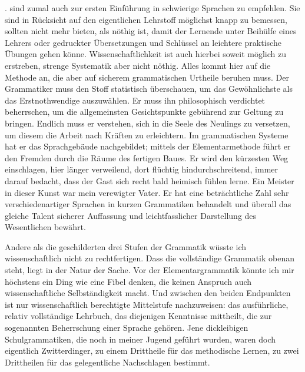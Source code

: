 .  sind zumal auch zur ersten Einführung in schwierige Sprachen zu empfehlen. Sie sind in Rücksicht auf den eigentlichen Lehrstoff möglichst knapp zu bemessen, sollten nicht mehr bieten, als nöthig ist, damit der Lernende unter Beihülfe \label{fp.118} eines Lehrers oder gedruckter Übersetzungen und Schlüssel an leichtere praktische Übungen gehen könne. Wissenschaftlichkeit ist auch hierbei soweit möglich zu erstreben, strenge Systematik aber nicht nöthig. Alles kommt hier auf die Methode an, die aber auf sicherem grammatischen Urtheile beruhen muss. Der Grammatiker muss den Stoff statistisch überschauen, um das Gewöhnlichste als das Erstnothwendige auszuwählen. Er muss ihn philosophisch verdichtet beherrschen, um die allgemeinsten Gesichtspunkte gebührend zur Geltung zu bringen. Endlich muss er verstehen, sich in die Seele des Neulings zu versetzen, um diesem die Arbeit nach Kräften zu erleichtern. Im grammatischen Systeme hat er das Sprachgebäude nachgebildet; mittels der Elementarmethode führt er den Fremden durch die Räume des fertigen Baues. Er wird den kürzesten Weg einschlagen, hier länger verweilend, dort flüchtig hindurchschreitend, immer darauf bedacht, dass der Gast sich recht bald heimisch fühlen lerne. Ein Meister in dieser Kunst war mein verewigter Vater. Er hat eine beträchtliche Zahl sehr verschiedenartiger Sprachen in kurzen Grammatiken behandelt und überall das gleiche Talent sicherer Auffassung und leichtfasslicher Darstellung des Wesentlichen bewährt.

\label{sp.113}

Andere als die geschilderten drei Stufen der Grammatik wüsste ich wissenschaftlich nicht zu rechtfertigen. Dass die vollständige Grammatik obenan steht, liegt in der Natur der Sache. Vor der Elementargrammatik könnte ich mir höchstens ein Ding wie eine Fibel denken, die keinen Anspruch auch wissenschaftliche Selbständigkeit macht. Und zwischen den beiden Endpunkten ist nur  wissenschaftlich berechtigte Mittelstufe nachzuweisen: das ausführliche, relativ vollständige Lehrbuch, das diejenigen Kenntnisse mittheilt, die zur sogenannten Beherrschung einer Sprache gehören. Jene dickleibigen Schulgrammatiken, die noch in meiner Jugend geführt wurden, waren doch eigentlich Zwitterdinger, zu einem Drittheile für das methodische Lernen, zu zwei Drittheilen für das gelegentliche Nachschlagen bestimmt.

